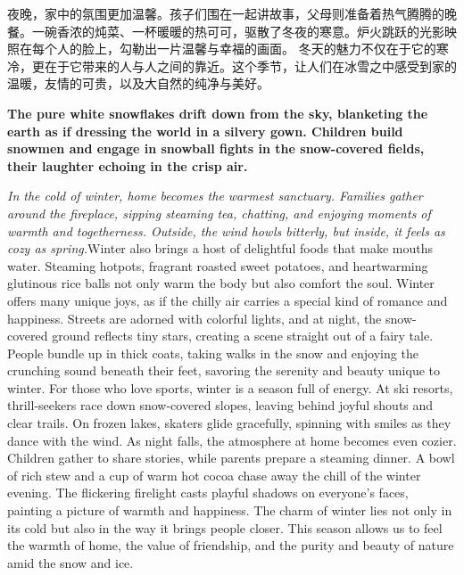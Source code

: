\documentclass{article} %
\begin{document}
{ %
夜晚，家中的氛围更加温馨。孩子们围在一起讲故事，父母则准备着热气腾腾的晚餐。一碗香浓的炖菜、一杯暖暖的热可可，驱散了冬夜的寒意。炉火跳跃的光影映照在每个人的脸上，勾勒出一片温馨与幸福的画面。}
{\songti
冬天的魅力不仅在于它的寒冷，更在于它带来的人与人之间的靠近。}这个季节，让人们在冰雪之中感受到家的温暖，友情的可贵，以及大自然的纯净与美好。\par
{\bfseries %
The pure white snowflakes drift down from the sky, blanketing the earth as if dressing the world in a silvery gown. Children build snowmen and engage in snowball fights in the snow-covered fields, their laughter echoing in the crisp air.}\par
{\itshape
In the cold of winter, home becomes the warmest sanctuary. Families gather around the fireplace, sipping steaming tea, chatting, and enjoying moments of warmth and togetherness. Outside, the wind howls bitterly, but inside, it feels as cozy as spring.}\textsf{Winter also brings a host of delightful foods that make mouths water.} Steaming hotpots, fragrant roasted sweet potatoes, and heartwarming glutinous rice balls not only warm the body but also comfort the soul.
Winter offers many unique joys, as if the chilly air carries a special kind of romance and happiness. Streets are adorned with colorful lights, and at night, the snow-covered ground reflects tiny stars, creating a scene straight out of a fairy tale. People bundle up in thick coats, taking walks in the snow and enjoying the crunching sound beneath their feet, savoring the serenity and beauty unique to winter.
For those who love sports, winter is a season full of energy. At ski resorts, thrill-seekers race down snow-covered slopes, leaving behind joyful shouts and clear trails. On frozen lakes, skaters glide gracefully, spinning with smiles as they dance with the wind.
As night falls, the atmosphere at home becomes even cozier. Children gather to share stories, while parents prepare a steaming dinner. A bowl of rich stew and a cup of warm hot cocoa chase away the chill of the winter evening. The flickering firelight casts playful shadows on everyone’s faces, painting a picture of warmth and happiness.
The charm of winter lies not only in its cold but also in the way it brings people closer. This season allows us to feel the warmth of home, the value of friendship, and the purity and beauty of nature amid the snow and ice.
\end{document}
